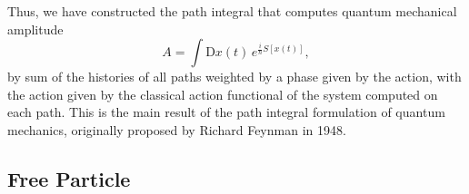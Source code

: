 Thus, we have constructed the path integral that computes quantum mechanical amplitude
\begin{equation}
    A = \int \mathrm{D} x(t) \, e^{\frac{i}{\hbar}S[x(t)]},
    \label{eq:Path_integral_configuration_space}
\end{equation}
by sum of the histories of all paths weighted by a phase given by the action, with the action given by the classical action functional of the system computed on each path. This is the main result of the path integral formulation of quantum mechanics, originally proposed by Richard Feynman in 1948.

\subsection{Free Particle}

